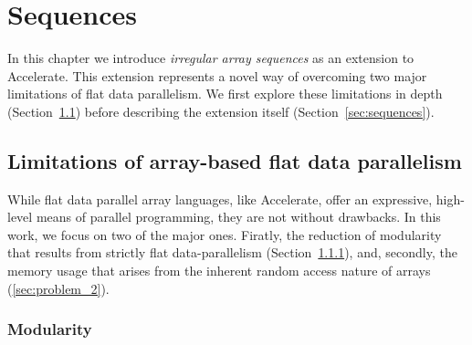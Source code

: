 \chapter{Sequences}
\label{chap:motivation}

In this chapter we introduce \emph{irregular array sequences} as an extension to Accelerate. This extension represents a novel way of overcoming two major limitations of flat data parallelism. We first explore these limitations in depth (Section~\ref{sec:limitations}) before describing the extension itself (Section~\ref{sec:sequences}).




\section{Limitations of array-based flat data parallelism}
\label{sec:limitations}
While flat data parallel array languages, like Accelerate, offer an expressive, high-level means of parallel programming, they are not without drawbacks. In this work, we focus on two of the major ones. Firatly, the reduction of modularity that results from strictly flat data-parallelism (Section~\ref{sec:problem_1}), and, secondly, the memory usage that arises from the inherent random access nature of arrays (\ref{sec:problem_2}).

\subsection{Modularity}
\label{sec:problem_1}

